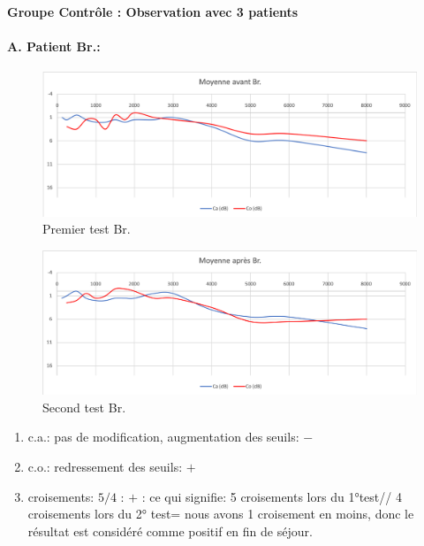 

   
     

      \textbf{Groupe Contrôle : Observation avec 3 patients}
  \paragraph{ A. Patient Br.:}
  \begin{figure}[ht]
\centering
\includegraphics[width=0.7\linewidth]{images/graphiques/bru_pre.png}
\caption[Moyenne OG+OD]{Premier test Br.}
       
\label{groupecontroleimage1}
\end{figure}



 \begin{figure}[th]
\centering
\includegraphics[width=0.7\linewidth]{images/graphiques/bru_post.png}
\caption[Moyenne OG+OD]{Second test Br.}
       
\label{groupecontroleimage1}
\end{figure}

	\begin{enumerate}
 		\item  c.a.: pas de modification, augmentation des
                  seuils: $-$
 		\item  c.o.: redressement des seuils: $+$
 		\item  croisements: $5/4$ : $+$ : ce qui signifie:  5 croisements lors du 1°test// 4 croisements lors du 2° test= nous avons 1 croisement en moins, donc le résultat est considéré comme positif en fin
                  de séjour.
                \end{enumerate}
 





